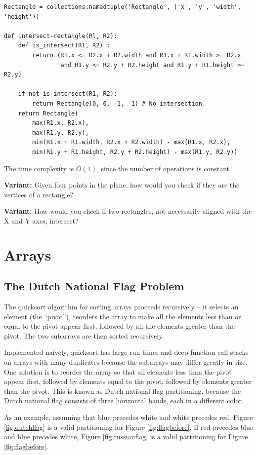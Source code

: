 \documentclass[11pt,a4paper]{article}
\begin{document}
\begin{verbatim}
Rectangle = collections.namedtuple('Rectangle', ('x', 'y', 'width', 'height'))

def intersect-rectangle(Rl, R2): 
    def is_intersect(R1, R2) :
        return (R1.x <= R2.x + R2.width and R1.x + R1.width >= R2.x
                and R1.y <= R2.y + R2.height and R1.y + R1.height >= R2.y)

    if not is_intersect(R1, R2):
        return Rectangle(0, 0, -1, -1) # No intersection.
    return Rectangle(
        max(R1.x, R2.x),
        max(R1.y, R2.y),
        min(R1.x + R1.width, R2.x + R2.width) - max(R1.x, R2.x), 
        min(R1.y + R1.height, R2.y + R2.height) - max(R1.y, R2.y))
\end{verbatim}

The time complexity is $O(1)$, since the number of operations is constant.

\textbf{Variant:} Given four points in the plane, how would you check if they
are the vertices of a rectangle?

\textbf{Variant:} How would you check if two rectangles, not necessarily
aligned with the X and Y axes, intersect?

\section{Arrays}

\subsection{The Dutch National Flag Problem}

The quicksort algorithm for sorting arrays proceeds recursively -- it selects
an element (the ``pivot''), reorders the array to make all the elements less
than or equal to the pivot appear first, followed by all the elements greater
than the pivot. The two subarrays are then sorted recursively.

Implemented naively, quicksort has large run times and deep function call
stacks on arrays with many duplicates because the subarrays may differ
greatly in size. One solution is to reorder the array so that all elements
less than the pivot appear first, followed by elements equal to the pivot,
followed by elements greater than the pivot. This is known as Dutch national
flag partitioning, because the Dutch national flag consists of three
horizontal bands, each in a different color.

As an example, assuming that blue precedes white and white precedes red,
Figure \ref{fig:dutchflag} is a valid partitioning for Figure
\ref{fig:flagbefore}. If red precedes blue and blue precedes white, Figure
\ref{fig:russianflag} is a valid partitioning for Figure \ref{fig:flagbefore}.
\end{document}
